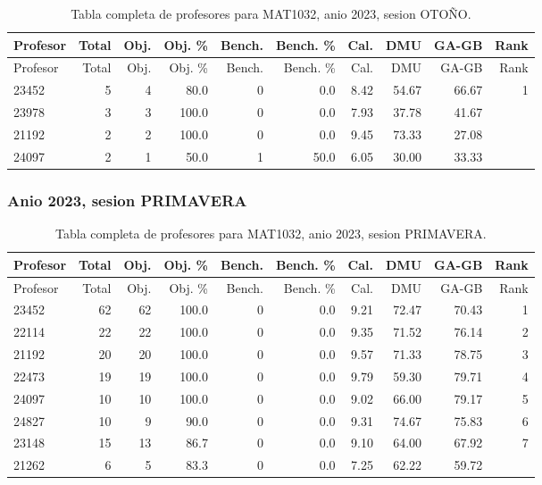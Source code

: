\begingroup
\scriptsize
\setlength{\tabcolsep}{3pt}
\begin{longtable}{lrrrrrrrrr}
\caption{Tabla completa de profesores para MAT1032, anio 2023, sesion OTOÑO.}\label{tab:prof-period-mat1032-2023-oto-o}\\
\toprule
Profesor & Total & Obj. & Obj. \% & Bench. & Bench. \% & Cal. & DMU & GA-GB & Rank \\
\midrule
\endfirsthead
\toprule
Profesor & Total & Obj. & Obj. \% & Bench. & Bench. \% & Cal. & DMU & GA-GB & Rank \\
\midrule
\endhead
23452 & 5 & 4 & 80.0 & 0 & 0.0 & 8.42 & 54.67 & 66.67 & 1 \\
23978 & 3 & 3 & 100.0 & 0 & 0.0 & 7.93 & 37.78 & 41.67 &  \\
21192 & 2 & 2 & 100.0 & 0 & 0.0 & 9.45 & 73.33 & 27.08 &  \\
24097 & 2 & 1 & 50.0 & 1 & 50.0 & 6.05 & 30.00 & 33.33 &  \\
\bottomrule
\end{longtable}
\endgroup

\subsubsection{Anio 2023, sesion PRIMAVERA}

\begingroup
\scriptsize
\setlength{\tabcolsep}{3pt}
\begin{longtable}{lrrrrrrrrr}
\caption{Tabla completa de profesores para MAT1032, anio 2023, sesion PRIMAVERA.}\label{tab:prof-period-mat1032-2023-primavera}\\
\toprule
Profesor & Total & Obj. & Obj. \% & Bench. & Bench. \% & Cal. & DMU & GA-GB & Rank \\
\midrule
\endfirsthead
\toprule
Profesor & Total & Obj. & Obj. \% & Bench. & Bench. \% & Cal. & DMU & GA-GB & Rank \\
\midrule
\endhead
23452 & 62 & 62 & 100.0 & 0 & 0.0 & 9.21 & 72.47 & 70.43 & 1 \\
22114 & 22 & 22 & 100.0 & 0 & 0.0 & 9.35 & 71.52 & 76.14 & 2 \\
21192 & 20 & 20 & 100.0 & 0 & 0.0 & 9.57 & 71.33 & 78.75 & 3 \\
22473 & 19 & 19 & 100.0 & 0 & 0.0 & 9.79 & 59.30 & 79.71 & 4 \\
24097 & 10 & 10 & 100.0 & 0 & 0.0 & 9.02 & 66.00 & 79.17 & 5 \\
24827 & 10 & 9 & 90.0 & 0 & 0.0 & 9.31 & 74.67 & 75.83 & 6 \\
23148 & 15 & 13 & 86.7 & 0 & 0.0 & 9.10 & 64.00 & 67.92 & 7 \\
21262 & 6 & 5 & 83.3 & 0 & 0.0 & 7.25 & 62.22 & 59.72 &  \\
\bottomrule
\end{longtable}
\endgroup

